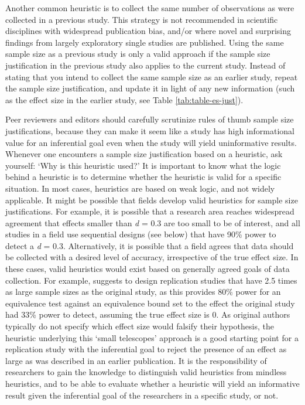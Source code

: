 \documentclass[
  oneside]{book}
\begin{document}
Another common heuristic is to collect the same number of observations as were collected in a previous study. This strategy is not recommended in scientific disciplines with widespread publication bias, and/or where novel and surprising findings from largely exploratory single studies are published. Using the same sample size as a previous study is only a valid approach if the sample size justification in the previous study also applies to the current study. Instead of stating that you intend to collect the same sample size as an earlier study, repeat the sample size justification, and update it in light of any new information (such as the effect size in the earlier study, see Table \ref{tab:table-es-just}).

Peer reviewers and editors should carefully scrutinize rules of thumb sample size justifications, because they can make it seem like a study has high informational value for an inferential goal even when the study will yield uninformative results. Whenever one encounters a sample size justification based on a heuristic, ask yourself: `Why is this heuristic used?' It is important to know what the logic behind a heuristic is to determine whether the heuristic is valid for a specific situation. In most cases, heuristics are based on weak logic, and not widely applicable. It might be possible that fields develop valid heuristics for sample size justifications. For example, it is possible that a research area reaches widespread agreement that effects smaller than \emph{d} = 0.3 are too small to be of interest, and all studies in a field use sequential designs (see below) that have 90\% power to detect a \emph{d} = 0.3. Alternatively, it is possible that a field agrees that data should be collected with a desired level of accuracy, irrespective of the true effect size. In these cases, valid heuristics would exist based on generally agreed goals of data collection. For example, \citet{simonsohn_small_2015} suggests to design replication studies that have 2.5 times as large sample sizes as the original study, as this provides 80\% power for an equivalence test against an equivalence bound set to the effect the original study had 33\% power to detect, assuming the true effect size is 0. As original authors typically do not specify which effect size would falsify their hypothesis, the heuristic underlying this `small telescopes' approach is a good starting point for a replication study with the inferential goal to reject the presence of an effect as large as was described in an earlier publication. It is the responsibility of researchers to gain the knowledge to distinguish valid heuristics from mindless heuristics, and to be able to evaluate whether a heuristic will yield an informative result given the inferential goal of the researchers in a specific study, or not.
\end{document}
